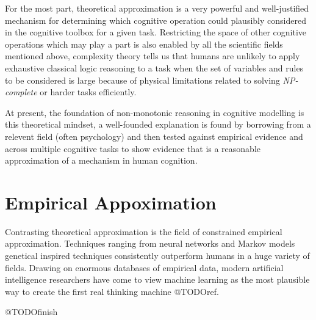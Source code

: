 For the most part, theoretical approximation is a very powerful and well-justified mechanism for determining which cognitive operation could plausibly considered in the cognitive toolbox for a given task. Restricting the space of other cognitive operations which may play a part is also enabled by all the scientific fields mentioned above, complexity theory tells us that humans are unlikely to apply exhaustive classical logic reasoning to a task when the set of variables and rules to be considered is large because of physical limitations related to solving \textit{NP-complete} or harder tasks efficiently.

At present, the foundation of non-monotonic reasoning in cognitive modelling is this theoretical mindset, a well-founded explanation is found by borrowing from a relevent field (often psychology) and then tested against empirical evidence and across multiple cognitive tasks to show evidence that is a reasonable approximation of a mechanism in human cognition.


\section{Empirical Appoximation}
Contrasting theoretical approximation is the field of constrained empirical approximation. Techniques ranging from neural networks and Markov models genetical inspired techniques consistently outperform humans in a huge variety of fields. Drawing on enormous databases of empirical data, modern artificial intelligence researchers have come to view machine learning as the most plausible way to create the first real thinking machine @TODOref.

@TODOfinish
